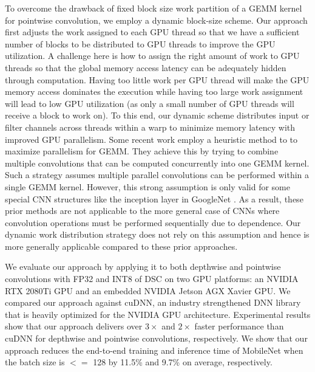 To overcome the drawback of fixed block size work partition of a GEMM kernel for pointwise convolution, we employ a dynamic block-size
scheme. Our approach first adjusts the work assigned to each GPU thread so that we have a sufficient number of blocks to be distributed to GPU
threads to improve the GPU utilization. A challenge here is how to assign the right amount of work to GPU threads so that the global memory
access latency can be adequately hidden through computation. Having too little work per GPU thread will make the GPU memory access
dominates the execution while having too large work assignment will lead to low GPU utilization (as only a small number of GPU threads will
receive a block to work on). To this end, our dynamic scheme distributes input or filter channels across threads within a warp to minimize
memory latency with improved GPU parallelism. Some recent work \cite{li2019coordinated,pourghassemi2020limits} employ a heuristic method to
to maximize parallelism for GEMM. They achieve this by trying to combine multiple convolutions that can be computed concurrently into one
GEMM kernel. Such a strategy assumes multiple parallel convolutions can be performed within a single GEMM kernel. However, this strong
assumption is only valid for some special CNN structures like the inception layer in GoogleNet \cite{szegedy2015going}. As a result, these
prior methods are not applicable to the more general case of CNNs where convolution operations must be performed sequentially due to
dependence. Our dynamic work distribution strategy does not rely on this assumption and hence is more generally applicable compared to
these prior approaches.

We evaluate our approach by applying it to both depthwise and pointwise convolutions with FP32 and INT8 of DSC on two GPU platforms: an NVIDIA RTX 2080Ti GPU
and an embedded NVIDIA Jetson AGX Xavier GPU. We compared our approach against cuDNN, an industry strengthened DNN library that is heavily
optimized for the NVIDIA GPU architecture. Experimental results show that our approach delivers over $3\times$ and $2\times$ faster
performance than cuDNN for depthwise and pointwise convolutions, respectively. We show that our approach reduces the end-to-end training
and inference time of MobileNet \cite{Sandler_2018_CVPR,howard2019searching} when the batch size is $<=$ 128 by 11.5\% and 9.7\% on average, respectively.



